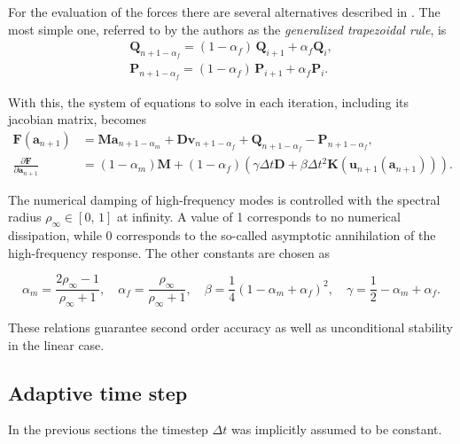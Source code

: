 For the evaluation of the forces there are several alternatives described in \cite{bib:erlicher2002}.
The most simple one, referred to by the authors as the \textit{generalized trapezoidal rule}, is
%
\begin{align}
\boldsymbol{Q}_{n+1-\alpha_f} =  (1 - \alpha_f)\,\boldsymbol{Q}_{i+1} + \alpha_f\boldsymbol{Q}_{i}, \\
\boldsymbol{P}_{n+1-\alpha_f} =  (1 - \alpha_f)\,\boldsymbol{P}_{i+1} + \alpha_f\boldsymbol{P}_{i}.
\end{align}

With this, the system of equations to solve in each iteration, including its jacobian matrix, becomes
%
\begin{align}
\boldsymbol{F}(\boldsymbol{a}_{n+1}) &= \boldsymbol{M}\boldsymbol{a}_{n+1-\alpha_m} + \boldsymbol{D}\mathbf{v}_{n+1-\alpha_f} + \boldsymbol{Q}_{n+1-\alpha_f} - \boldsymbol{P}_{n+1-\alpha_f}, \\
\frac{\partial \boldsymbol{F}}{\partial \boldsymbol{a}_{n+1}} &= (1 - \alpha_m)\boldsymbol{M} + (1 - \alpha_f)\left( \gamma \Delta t \boldsymbol{D} + \beta \Delta t^2 \boldsymbol{K}(\boldsymbol{u}_{n+1}(\boldsymbol{a}_{n+1})) \right).
\end{align}

The numerical damping of high-frequency modes is controlled with the spectral radius $\rho_{\infty} \in [0,\,1]$ at infinity.
A value of 1 corresponds to no numerical dissipation, while 0 corresponds to the so-called asymptotic annihilation of the high-frequency response.
The other constants are chosen as

\begin{equation}
\alpha_m = \frac{2\rho_{\infty} - 1}{\rho_{\infty} + 1},\quad \alpha_f = \frac{\rho_{\infty}}{\rho_{\infty} + 1},\quad \beta = \frac{1}{4}\left(1 - \alpha_m + \alpha_f\right)^2,\quad \gamma = \frac{1}{2} - \alpha_m + \alpha_f.
\end{equation}

These relations guarantee second order accuracy as well as unconditional stability in the linear case.

\newpage
\subsection{Adaptive time step}

In the previous sections the timestep $\Delta t$ was implicitly assumed to be constant.

\cite{bib:hulbert1995}

